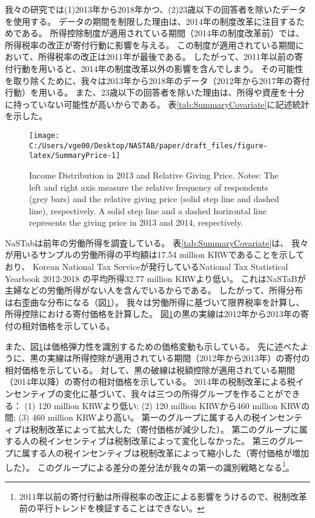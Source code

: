 \documentclass[
  11pt,
  a4paper,
]{article}
\begin{document}
我々の研究では(1)2013年から2018年かつ、(2)23歳以下の回答者を除いたデータを使用する。
データの期間を制限した理由は、2014年の制度改革に注目するためである。
所得控除制度が適用されている期間（2014年の制度改革前）では、所得税率の改正が寄付行動に影響を与える。
この制度が適用されている期間において、所得税率の改正は2011年が最後である。
したがって、2011年以前の寄付行動を用いると、2014年の制度改革以外の影響を含んでしまう。
その可能性を取り除くために、我々は2013年から2018年のデータ（2012年から2017年の寄付行動）を用いる。
また、23歳以下の回答者を除いた理由は、所得や資産を十分に持っていない可能性が高いからである。
表\ref{tab:SummaryCovariate}に記述統計を示した。

\begin{figure}[t]

{\centering \texttt{[image: C:/Users/vge00/Desktop/NASTAB/paper/draft\_files/figure-latex/SummaryPrice-1]} 

}

\caption{Income Distribution in 2013 and Relative Giving Price. Notes: The left and right axis measure the relative frequency of respondents (grey bars) and the relative giving price (solid step line and dashed line), respectively. A solid step line and a dashed horizontal line represents the giving price in 2013 and 2014, respectively.}\label{fig:SummaryPrice}
\end{figure}

NaSTabは前年の労働所得を調査している。
表\ref{tab:SummaryCovariate}は、
我々が用いるサンプルの労働所得の平均額は17.54 million KRWであることを示しており、
Korean National Tax Serviceが発行しているNational Tax Statistical Yearbook 2012-2018
の平均所得32.77 million KRWより低い。
これはNaSTaBが主婦などの労働所得がない人を含んでいるからである。
したがって、所得分布は右歪曲な分布になる（図\ref{fig:SummaryPrice}）。
我々は労働所得に基づいて限界税率を計算し、所得控除における寄付価格を計算した。
図\ref{fig:SummaryPrice}の黒の実線は2012年から2013年の寄付の相対価格を示している。

また、図\ref{fig:SummaryPrice}は価格弾力性を識別するための価格変動も示している。
先に述べたように、黒の実線は所得控除が適用されている期間（2012年から2013年）の寄付の相対価格を示している。
対して、黒の破線は税額控除が適用されている期間（2014年以降）の寄付の相対価格を示している。
2014年の税制改革による税インセンティブの変化に基づいて、我々は三つの所得グループを作ることができる：
(1) 120 million KRWより低い;
(2) 120 million KRWから460 million KRWの間;
(3) 460 million KRWより高い。
第一のグループに属する人の税インセンティブは税制改革によって拡大した（寄付価格が減少した）。
第二のグループに属する人の税インセンティブは税制改革によって変化しなかった。
第三のグループに属する人の税インセンティブは税制改革によって縮小した（寄付価格が増加した）。
このグループによる差分の差分法が我々の第一の識別戦略となる\footnote{2011年以前の寄付行動は所得税率の改正による影響をうけるので、税制改革前の平行トレンドを検証することはできない。}。
\end{document}
